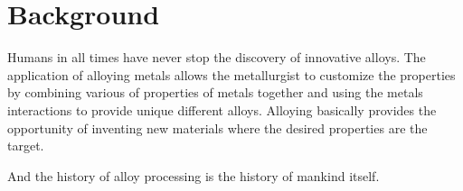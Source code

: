 \section{Background}

Humans in all times have never stop the discovery of innovative alloys. The application of alloying metals allows the metallurgist to customize the properties by combining various of properties of metals together and using the metals interactions to provide unique different alloys. Alloying basically provides the opportunity of inventing new materials where the desired properties are the target.

And the history of alloy processing is the history of mankind itself.